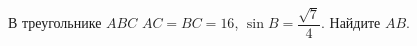 \begin{ex}
	\begin{condition}
		В треугольнике  \( ABC \) \(AC=BC=16\),  \( \sin B=\dfrac{\sqrt{7}}{4} \).  Найдите \( AB \).
	\end{condition}
\end{ex}